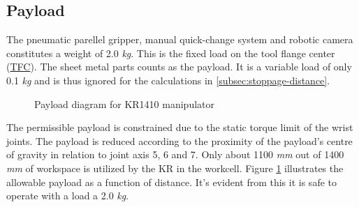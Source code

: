 \subsection{Payload}
\label{subsec:payload}
The pneumatic parellel gripper, manual quick-change system and robotic camera constitutes a weight of 2.0 \textit{kg}.
This is the fixed load on the tool flange center (\hyperref[acro:TFC]{TFC}). The sheet metal parts counts as the payload.
It is a variable load of only 0.1 \textit{kg} and is thus ignored for the calculations in \ref{subsec:stoppage-distance}.


\begin{figure}[h]
    \centering
    
    \caption{Payload diagram for KR1410 manipulator}
    \label{fig:kr1410-payload-diagram}
\end{figure}


The permissible payload is constrained due to the static torque limit of the wrist joints. The payload is
reduced according to the proximity of the payload's centre of gravity in relation to joint axis 5, 6 and 7. \cite[page 35]{kassow-manual}
Only about 1100 \textit{mm} out of 1400 \textit{mm} of workspace is utilized by the KR in the workcell. 
Figure \ref{fig:kr1410-payload-diagram}
illustrates the allowable payload as a function of distance. It's evident from this it is safe to operate with a load a 2.0 \textit{kg}.

